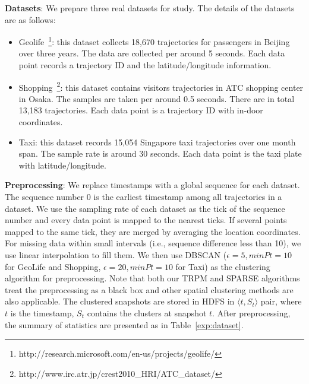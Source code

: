 \textbf{Datasets}: We prepare three real datasets for study. The details of the datasets are as follows:
\begin{itemize}
\item{Geolife}~\footnote{http://research.microsoft.com/en-us/projects/geolife/}: this dataset collects 
18,670 trajectories for passengers in Beijing over three years. The data are collected
per around 5 seconds. Each data point records a trajectory ID and the latitude/longitude information.
\item{Shopping}~\footnote{http://www.irc.atr.jp/crest2010\_HRI/ATC\_dataset/}: this dataset contains
 visitors trajectories in ATC shopping center in Osaka. The samples are taken per
 around 0.5 seconds. There are in total 13,183 trajectories. Each data point is a 
 trajectory ID with in-door coordinates.
\item{Taxi}: this dataset records 15,054 Singapore taxi trajectories over one month span. The sample 
rate is around 30 seconds. Each data point is the taxi plate with latitude/longitude.
\end{itemize}

\textbf{Preprocessing}: We replace timestamps with a global sequence for each dataset. The sequence number
$0$ is the earliest timestamp among all trajectories in a dataset. We use the sampling rate of 
each dataset as the tick of the sequence number and every data point is mapped to the nearest ticks. If
several points mapped to the same tick, they are merged by averaging the location coordinates.
For missing data within small intervals (i.e., sequence difference less than 10), 
we use linear interpolation to fill them. 
We then use DBSCAN ($\epsilon=5, minPt=10$ for GeoLife and Shopping, $\epsilon=20, minPt=10$ for Taxi)
as the clustering algorithm for preprocessing.  
Note that both our TRPM and SPARSE algorithms treat the preprocessing as a black box and other
spatial clustering methods are also applicable. The clustered snapshots are stored in HDFS in $\langle t, S_t \rangle$ pair, where
$t$ is the timestamp, $S_t$ contains the clusters at snapshot $t$. 
After preprocessing, the summary of statistics are presented as in Table~\ref{exp:dataset}. 

